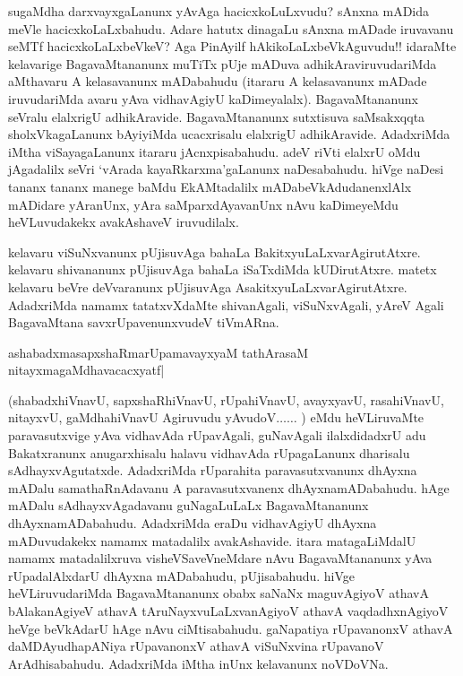 sugaMdha darxvayxgaLanunx yAvAga hacicxkoLuLxvudu? sAnxna mADida meVle hacicxkoLaLxbahudu. Adare hatutx dinagaLu sAnxna mADade iruvavanu seMTf hacicxkoLaLxbeVkeV? Aga PinAyilf hAkikoLaLxbeVkAguvudu!! idaraMte kelavarige BagavaMtananunx muTiTx pUje mADuva adhikAraviruvudariMda aMthavaru A kelasavanunx mADabahudu (itararu A kelasavanunx mADade iruvudariMda avaru yAva vidhavAgiyU kaDimeyalalx). BagavaMtananunx seVralu elalxrigU adhikAravide. BagavaMtananunx sutxtisuva saMsakxqqta sholxVkagaLanunx bAyiyiMda ucacxrisalu elalxrigU adhikAravide. AdadxriMda iMtha viSayagaLanunx itararu jAcnxpisabahudu. adeV riVti elalxrU oMdu jAgadalilx seVri `vArada kayaRkarxma'gaLanunx naDesabahudu. hiVge naDesi tananx tananx manege baMdu EkAMtadalilx mADabeVkAdudanenxlAlx mADidare yAranUnx, yAra saMparxdAyavanUnx nAvu kaDimeyeMdu heVLuvudakekx avakAshaveV iruvudilalx.

kelavaru viSuNxvanunx pUjisuvAga bahaLa BakitxyuLaLxvarAgirutAtxre. 
kelavaru shivananunx pUjisuvAga bahaLa iSaTxdiMda kUDirutAtxre. matetx 
kelavaru beVre deVvaranunx pUjisuvAga AsakitxyuLaLxvarAgirutAtxre. 
AdadxriMda namamx tatatxvXdaMte shivanAgali, viSuNxvAgali, yAreV Agali 
BagavaMtana savxrUpavenunxvudeV tiVmARna.

\begin{shloka}
ashabadxmasapxshaRmarUpamavayxyaM tathA\s rasaM 
nitayxmagaMdhavacacxyatf|\\
\end{shloka}

(shabadxhiVnavU, sapxshaRhiVnavU, rUpahiVnavU, avayxyavU, rasahiVnavU, nitayxvU, gaMdhahiVnavU Agiruvudu yAvudoV$\ldots\ldots$ ) eMdu heVLiruvaMte paravasutxvige yAva vidhavAda rUpavAgali, guNavAgali ilalxdidadxrU adu Bakatxranunx anugarxhisalu halavu vidhavAda rUpagaLanunx dharisalu sAdhayxvAgutatxde. AdadxriMda rUparahita paravasutxvanunx dhAyxna mADalu samathaRnAdavanu A paravasutxvanenx dhAyxnamADabahudu. hAge mADalu sAdhayxvAgadavanu guNagaLuLaLx BagavaMtananunx dhAyxnamADabahudu. AdadxriMda eraDu vidhavAgiyU dhAyxna mADuvudakekx namamx matadalilx avakAshavide. itara matagaLiMdalU namamx matadalilxruva visheVSaveVneMdare nAvu BagavaMtananunx yAva rUpadalAlxdarU dhAyxna mADabahudu, pUjisabahudu. hiVge heVLiruvudariMda BagavaMtananunx obabx saNaNx maguvAgiyoV athavA bAlakanAgiyeV athavA tAruNayxvuLaLxvanAgiyoV athavA vaqdadhxnAgiyoV heVge beVkAdarU hAge nAvu ciMtisabahudu. gaNapatiya rUpavanonxV athavA daMDAyudhapANiya rUpavanonxV athavA viSuNxvina rUpavanoV ArAdhisabahudu. AdadxriMda iMtha inUnx kelavanunx noVDoVNa.

